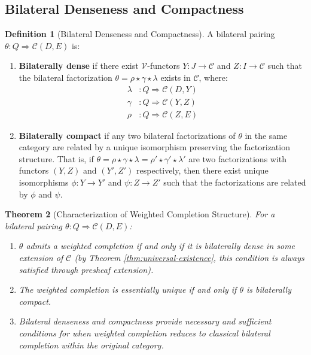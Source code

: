 \documentclass[11pt]{article}
\theoremstyle{plain}
\newtheorem{theorem}{Theorem}[section]
\theoremstyle{definition}
\newtheorem{definition}[theorem]{Definition}
\theoremstyle{remark}
\newcommand{\V}{\mathcal{V}}
\newcommand{\C}{\mathcal{C}}
\begin{document}
\subsection{Bilateral Denseness and Compactness}

\begin{definition}[Bilateral Denseness and Compactness]\label{def:bilateral-conditions}
A bilateral pairing $\theta : Q \Rightarrow \C(D, E)$ is:

\begin{enumerate}
\item \textbf{Bilaterally dense} if there exist $\V$-functors $Y : J \to \C$ and $Z : I \to \C$ such that the bilateral factorization $\theta = \rho \star \gamma \star \lambda$ exists in $\C$, where:
\begin{align}
\lambda &: Q \Rightarrow \C(D, Y) \\
\gamma &: Q \Rightarrow \C(Y, Z) \\
\rho &: Q \Rightarrow \C(Z, E)
\end{align}

\item \textbf{Bilaterally compact} if any two bilateral factorizations of $\theta$ in the same category are related by a unique isomorphism preserving the factorization structure. That is, if $\theta = \rho \star \gamma \star \lambda = \rho' \star \gamma' \star \lambda'$ are two factorizations with functors $(Y, Z)$ and $(Y', Z')$ respectively, then there exist unique isomorphisms $\phi : Y \to Y'$ and $\psi : Z \to Z'$ such that the factorizations are related by $\phi$ and $\psi$.
\end{enumerate}
\end{definition}

\begin{theorem}[Characterization of Weighted Completion Structure]\label{thm:bilateral-characterization}
For a bilateral pairing $\theta : Q \Rightarrow \C(D, E)$:

\begin{enumerate}
\item $\theta$ admits a weighted completion if and only if it is bilaterally dense in some extension of $\C$ (by Theorem \ref{thm:universal-existence}, this condition is always satisfied through presheaf extension).

\item The weighted completion is essentially unique if and only if $\theta$ is bilaterally compact.

\item Bilateral denseness and compactness provide necessary and sufficient conditions for when weighted completion reduces to classical bilateral completion within the original category.
\end{enumerate}
\end{theorem}
\end{document}
